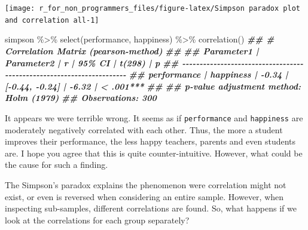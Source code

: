 \documentclass[
]{book}
\newenvironment{Shaded}{\begin{snugshade}}{\end{snugshade}}
\newcommand{\DocumentationTok}[1]{\textcolor[rgb]{0.56,0.35,0.01}{\textbf{\textit{#1}}}}
\newcommand{\FunctionTok}[1]{\textcolor[rgb]{0.00,0.00,0.00}{#1}}
\newcommand{\NormalTok}[1]{#1}
\newcommand{\SpecialCharTok}[1]{\textcolor[rgb]{0.00,0.00,0.00}{#1}}
\begin{document}
\begin{center}\texttt{[image: r\_for\_non\_programmers\_files/figure-latex/Simpson paradox plot and correlation all-1]} \end{center}

\begin{Shaded}
\begin{Highlighting}[]

\NormalTok{simpson }\SpecialCharTok{\%\textgreater{}\%} 
  \FunctionTok{select}\NormalTok{(performance, happiness) }\SpecialCharTok{\%\textgreater{}\%} 
  \FunctionTok{correlation}\NormalTok{()}
\DocumentationTok{\#\# \# Correlation Matrix (pearson{-}method)}
\DocumentationTok{\#\# }
\DocumentationTok{\#\# Parameter1  | Parameter2 |     r |         95\% CI | t(298) |         p}
\DocumentationTok{\#\# {-}{-}{-}{-}{-}{-}{-}{-}{-}{-}{-}{-}{-}{-}{-}{-}{-}{-}{-}{-}{-}{-}{-}{-}{-}{-}{-}{-}{-}{-}{-}{-}{-}{-}{-}{-}{-}{-}{-}{-}{-}{-}{-}{-}{-}{-}{-}{-}{-}{-}{-}{-}{-}{-}{-}{-}{-}{-}{-}{-}{-}{-}{-}{-}{-}{-}{-}{-}{-}{-}}
\DocumentationTok{\#\# performance |  happiness | {-}0.34 | [{-}0.44, {-}0.24] |  {-}6.32 | \textless{} .001***}
\DocumentationTok{\#\# }
\DocumentationTok{\#\# p{-}value adjustment method: Holm (1979)}
\DocumentationTok{\#\# Observations: 300}
\end{Highlighting}
\end{Shaded}

It appears we were terrible wrong. It seems as if \texttt{performance} and \texttt{happiness} are moderately negatively correlated with each other. Thus, the more a student improves their performance, the less happy teachers, parents and even students are. I hope you agree that this is quite counter-intuitive. However, what could be the cause for such a finding.

The Simpson's paradox explains the phenomenon were correlation might not exist, or even is reversed when considering an entire sample. However, when inspecting sub-samples, different correlations are found. So, what happens if we look at the correlations for each group separately?
\end{document}
